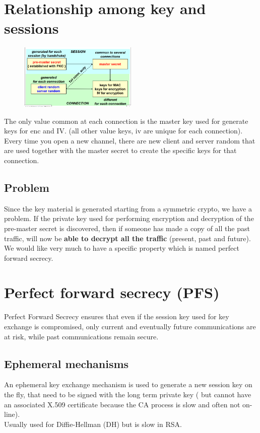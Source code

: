 \section{Relationship among key and sessions}

\begin{figure}[h!]
    \centering
    \includegraphics[width=0.5\textwidth]{img/key_sess.png}
    \label{fig:key_session}
\end{figure}

The only value common at each connection is the master key used for generate keys for enc and IV.
(all other value keys, iv are unique for each connection). \\
Every time you open a new channel, there are new client and server random that are used together with the master secret to create the specific keys for that connection.

\subsection{Problem}
Since the key material is generated starting from a symmetric crypto, we have a problem. If the private key used for performing encryption and decryption of the pre-master secret is discovered, then if someone has made a copy of all the past traffic, will now be \textbf{able to decrypt all the traffic} (present, past and future). \\
We would like very much to have a specific property which is named perfect forward secrecy.

\section{Perfect forward secrecy (PFS)}
Perfect Forward Secrecy ensures that even if the session key used for key exchange is compromised, only current and eventually future communications are at risk, while past communications remain secure.

\subsection{Ephemeral mechanisms}
An ephemeral key exchange mechanism is used to generate a new session key on the fly, that need to be signed with the long term private key ( but cannot have an associated X.509 certificate because the CA process is slow and often not on-line). \\ Usually used for Diffie-Hellman (DH) but is slow in RSA. \\

